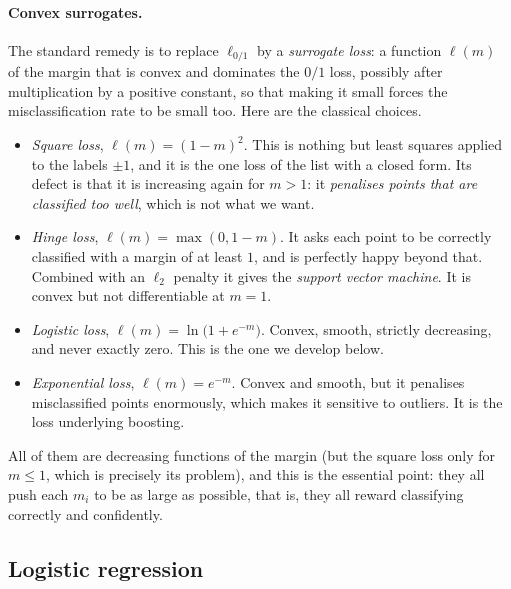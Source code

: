 \paragraph{Convex surrogates.}
The standard remedy is to replace $\ell_{0/1}$ by a \emph{surrogate loss}: a function
$\ell(m)$ of the margin that is convex and dominates the $0/1$ loss,
possibly after multiplication by a positive constant, so that making it small forces
the misclassification rate to be small too. Here are the classical choices.
\begin{itemize}
    \item \emph{Square loss}, $\ell(m) = (1 - m)^2$. This is nothing but least squares
    applied to the labels $\pm 1$, and it is the one loss of the list with a closed
    form. Its defect is that it is increasing again for $m > 1$: it \emph{penalises
    points that are classified too well}, which is not what we want.
    \item \emph{Hinge loss}, $\ell(m) = \max(0, 1 - m)$. It asks each point to be
    correctly classified with a margin of at least $1$, and is perfectly happy beyond
    that. Combined with an $\ell_2$ penalty it gives the \emph{support vector
    machine}. It is convex but not differentiable at $m = 1$.
    \item \emph{Logistic loss}, $\ell(m) = \ln\big(1 + e^{-m}\big)$. Convex, smooth,
    strictly decreasing, and never exactly zero. This is the one we develop below.
    \item \emph{Exponential loss}, $\ell(m) = e^{-m}$. Convex and smooth, but it
    penalises misclassified points enormously, which makes it sensitive to outliers.
    It is the loss underlying boosting.
\end{itemize}
All of them are decreasing functions of the margin (but the square loss only for $m \leq 1$,
which is precisely its problem), and this is the essential point: they all push each
$m_i$ to be as large as possible, that is, they all reward classifying correctly and
confidently.


\subsection{Logistic regression}
\label{subsec:logistic}

